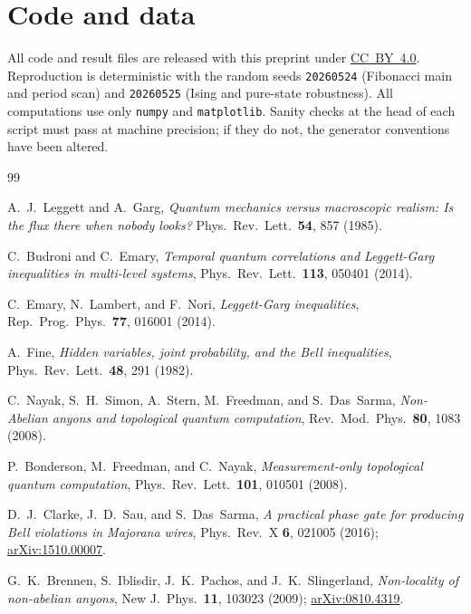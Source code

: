 \documentclass[aps,prx,reprint,amsmath,amssymb,floatfix,nofootinbib,superscriptaddress]{revtex4-2}
\begin{document}
\section{Code and data}

All code and result files are released with this preprint under
\href{https://creativecommons.org/licenses/by/4.0/}{CC~BY~4.0}.
Reproduction is deterministic with the random seeds
\texttt{20260524} (Fibonacci main and period scan) and
\texttt{20260525} (Ising and pure-state robustness). All
computations use only \texttt{numpy} and \texttt{matplotlib}.
Sanity checks at the head of each script must pass at machine
precision; if they do not, the generator conventions have been
altered.

\begin{thebibliography}{99}

A.~J.~Leggett and A.~Garg,
\emph{Quantum mechanics versus macroscopic realism: Is the flux there when nobody looks?}
Phys.\ Rev.\ Lett.\ \textbf{54}, 857 (1985).

C.~Budroni and C.~Emary,
\emph{Temporal quantum correlations and Leggett-Garg inequalities in multi-level systems},
Phys.\ Rev.\ Lett.\ \textbf{113}, 050401 (2014).

C.~Emary, N.~Lambert, and F.~Nori,
\emph{Leggett-Garg inequalities},
Rep.\ Prog.\ Phys.\ \textbf{77}, 016001 (2014).

A.~Fine,
\emph{Hidden variables, joint probability, and the Bell inequalities},
Phys.\ Rev.\ Lett.\ \textbf{48}, 291 (1982).

C.~Nayak, S.~H.~Simon, A.~Stern, M.~Freedman, and S.~Das~Sarma,
\emph{Non-Abelian anyons and topological quantum computation},
Rev.\ Mod.\ Phys.\ \textbf{80}, 1083 (2008).

P.~Bonderson, M.~Freedman, and C.~Nayak,
\emph{Measurement-only topological quantum computation},
Phys.\ Rev.\ Lett.\ \textbf{101}, 010501 (2008).

D.~J.~Clarke, J.~D.~Sau, and S.~Das~Sarma,
\emph{A practical phase gate for producing Bell violations in Majorana wires},
Phys.\ Rev.\ X \textbf{6}, 021005 (2016);
\href{https://arxiv.org/abs/1510.00007}{arXiv:1510.00007}.

G.~K.~Brennen, S.~Iblisdir, J.~K.~Pachos, and J.~K.~Slingerland,
\emph{Non-locality of non-abelian anyons},
New J.\ Phys.\ \textbf{11}, 103023 (2009);
\href{https://arxiv.org/abs/0810.4319}{arXiv:0810.4319}.


\end{thebibliography}
\end{document}
